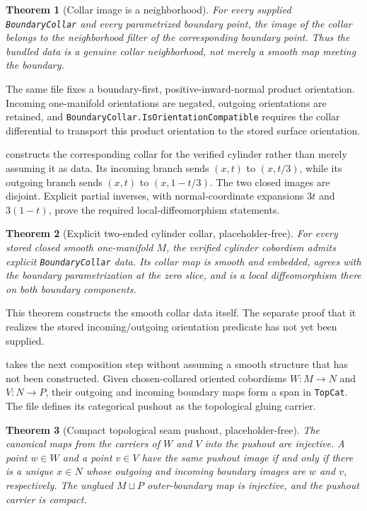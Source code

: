 \documentclass[11pt]{amsart}
\theoremstyle{plain}
\newtheorem{theorem}{Theorem}[section]
\theoremstyle{definition}
\begin{document}
\begin{theorem}[Collar image is a neighborhood]
For every supplied \texttt{BoundaryCollar} and every parametrized boundary
point, the image of the collar belongs to the neighborhood filter of the
corresponding boundary point.  Thus the bundled data is a genuine collar
neighborhood, not merely a smooth map meeting the boundary.
\end{theorem}

The same file fixes a boundary-first, positive-inward-normal product
orientation.  Incoming one-manifold orientations are negated, outgoing
orientations are retained, and
\texttt{BoundaryCollar.}\allowbreak\texttt{IsOrientationCompatible} requires the collar
differential to transport this product orientation to the stored surface
orientation.

 constructs the corresponding collar
for the verified cylinder rather than merely assuming it as data.  Its
incoming branch sends \((x,t)\) to \((x,t/3)\), while its outgoing branch
sends \((x,t)\) to \((x,1-t/3)\).  The two closed images are disjoint.
Explicit partial inverses, with normal-coordinate expansions \(3t\) and
\(3(1-t)\), prove the required local-diffeomorphism statements.

\begin{theorem}[Explicit two-ended cylinder collar, placeholder-free]
For every stored closed smooth one-manifold \(M\), the verified cylinder
cobordism admits explicit \texttt{BoundaryCollar} data.  Its collar map is
smooth and embedded, agrees with the boundary parametrization at the zero
slice, and is a local diffeomorphism there on both boundary components.
\end{theorem}

This theorem constructs the smooth collar data itself.  The separate proof
that it realizes the stored incoming/outgoing orientation predicate has not
yet been supplied.

 takes the next composition step
without assuming a smooth structure that has not been constructed.  Given
chosen-collared oriented cobordisms \(W:M\to N\) and \(V:N\to P\), their
outgoing and incoming boundary maps form a span in \texttt{TopCat}.  The file
defines its categorical pushout as the topological gluing carrier.

\begin{theorem}[Compact topological seam pushout, placeholder-free]
The canonical maps from the carriers of \(W\) and \(V\) into the pushout are
injective. A point \(w\in W\) and a point \(v\in V\) have the same pushout
image if and only if there is a unique \(x\in N\) whose outgoing and incoming
boundary images are \(w\) and \(v\), respectively. The unglued
\(M\sqcup P\) outer-boundary map is injective, and the pushout carrier is
compact.
\end{theorem}
\end{document}
